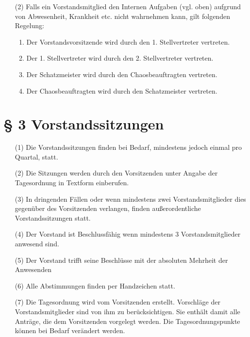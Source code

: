 \documentclass[a4paper,12pt]{scrartcl}
\begin{document}
\begin{enumerate}
\begin{enumerate}
\end{enumerate}

\item[(2)]
Falls ein Vorstandsmitglied den Internen Aufgaben (vgl. oben) aufgrund von Abwesenheit, Krankheit etc. nicht wahrnehmen kann, gilt folgenden Regelung:
\begin{enumerate}
\item Der Vorstandsvorsitzende wird durch den 1. Stellvertreter vertreten.
\item Der 1. Stellvertreter wird durch den 2. Stellvertreter vertreten.
\item Der Schatzmeister wird durch den Chaosbeauftragten vertreten.
\item Der Chaosbeauftragten wird durch den Schatzmeister vertreten.
\end{enumerate}

\end{enumerate}

\section*{\S{} 3 Vorstandssitzungen}
\begin{enumerate}
\item[(1)]
Die Vorstandssitzungen finden bei Bedarf, mindestens jedoch einmal pro Quartal, statt.
\item[(2)]
Die Sitzungen werden durch den Vorsitzenden unter Angabe der Tagesordnung in
Textform einberufen.
\item[(3)]
In dringenden Fällen oder wenn mindestens zwei Vorstandsmitglieder dies gegenüber
des Vorsitzenden verlangen, finden außerordentliche Vorstandssitzungen statt.
\item[(4)]
Der Vorstand ist Beschlussfähig wenn mindestens 3 Vorstandsmitglieder anwesend
sind.
\item[(5)]
Der Vorstand trifft seine Beschlüsse mit der absoluten Mehrheit der Anwesenden
\item[(6)]
Alle Abstimmungen finden per Handzeichen statt.
\item[(7)]
Die Tagesordnung wird vom Vorsitzenden erstellt. Vorschläge der Vorstandsmitglieder
sind von ihm zu berücksichtigen. Sie enthält damit alle Anträge, die dem Vorsitzenden
vorgelegt werden. Die Tagesordnungspunkte können bei Bedarf verändert werden.


\end{enumerate}
\end{document}
